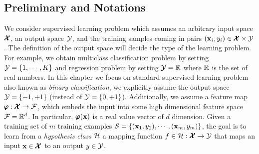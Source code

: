 \subsection{Preliminary and Notations}\label{sc_slc_pn}
We consider supervised learning problem which assumes an arbitrary input space $\pmb {\mathcal{X}}$, an output space $\mathcal{Y}$, and the training samples coming in pairs $(\mathbf {x}_i,y_i)\in\pmb {\mathcal{X}}\times\mathcal{Y}$.
The definition of the output space will decide the type of the learning problem.
For example, we obtain multiclass classification problem by setting $\mathcal{Y}=\{1,\cdots,K\}$ and regression problem by setting $\mathcal{Y}=\mathbb{R}$ where $\mathbb{R}$ is the set of real numbers.
In this chapter we focus on standard supervised learning problem also known as \textit{binary classification}, we explicitly assume the output space $\mathcal{Y}=\{-1,+1\}$ (instead of $\mathcal{Y}=\{0,+1\}$).
Additionally, we assume a feature map $\pmb \varphi:\pmb {\mathcal{X}}\rightarrow\mathcal{F}$, which embeds the input into some high dimensional feature space $\mathcal{F}=\mathbb{R}^d$.
In particular, $\pmb \varphi(\mathbf {x})$ is a real value vector of $d$ dimension.
Given a training set of $m$ training examples $\mathcal{S}=\{(\mathbf {x}_1,y_1),\cdots,(\mathbf {x}_m,y_m)\}$, the goal is to learn from a \textit{hypothesis class} $\mathcal{H}$ a mapping function $f\in\mathcal{H}:\pmb {\mathcal{X}}\rightarrow\mathcal{Y}$ that maps an input $\mathbf {x}\in\pmb {\mathcal{X}}$ to an output $y\in\mathcal{Y}$. 

